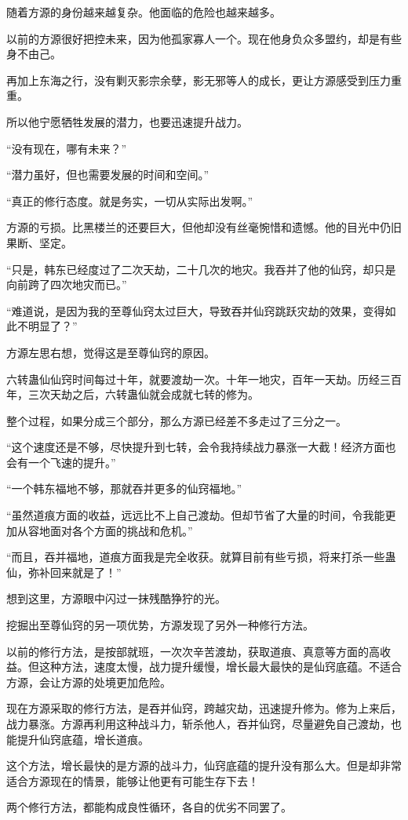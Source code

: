 \begin{this_body}
随着方源的身份越来越复杂。他面临的危险也越来越多。

以前的方源很好把控未来，因为他孤家寡人一个。现在他身负众多盟约，却是有些身不由己。

再加上东海之行，没有剿灭影宗余孽，影无邪等人的成长，更让方源感受到压力重重。

所以他宁愿牺牲发展的潜力，也要迅速提升战力。

“没有现在，哪有未来？”

“潜力虽好，但也需要发展的时间和空间。”

“真正的修行态度。就是务实，一切从实际出发啊。”

方源的亏损。比黑楼兰的还要巨大，但他却没有丝毫惋惜和遗憾。他的目光中仍旧果断、坚定。

“只是，韩东已经度过了二次天劫，二十几次的地灾。我吞并了他的仙窍，却只是向前跨了四次地灾而已。”

“难道说，是因为我的至尊仙窍太过巨大，导致吞并仙窍跳跃灾劫的效果，变得如此不明显了？”

方源左思右想，觉得这是至尊仙窍的原因。

六转蛊仙仙窍时间每过十年，就要渡劫一次。十年一地灾，百年一天劫。历经三百年，三次天劫之后，六转蛊仙就会成就七转的修为。

整个过程，如果分成三个部分，那么方源已经差不多走过了三分之一。

“这个速度还是不够，尽快提升到七转，会令我持续战力暴涨一大截！经济方面也会有一个飞速的提升。”

“一个韩东福地不够，那就吞并更多的仙窍福地。”

“虽然道痕方面的收益，远远比不上自己渡劫。但却节省了大量的时间，令我能更加从容地面对各个方面的挑战和危机。”

“而且，吞并福地，道痕方面我是完全收获。就算目前有些亏损，将来打杀一些蛊仙，弥补回来就是了！”

想到这里，方源眼中闪过一抹残酷狰狞的光。

挖掘出至尊仙窍的另一项优势，方源发现了另外一种修行方法。

以前的修行方法，是按部就班，一次次辛苦渡劫，获取道痕、真意等方面的高收益。但这种方法，速度太慢，战力提升缓慢，增长最大最快的是仙窍底蕴。不适合方源，会让方源的处境更加危险。

现在方源采取的修行方法，是吞并仙窍，跨越灾劫，迅速提升修为。修为上来后，战力暴涨。方源再利用这种战斗力，斩杀他人，吞并仙窍，尽量避免自己渡劫，也能提升仙窍底蕴，增长道痕。

这个方法，增长最快的是方源的战斗力，仙窍底蕴的提升没有那么大。但是却非常适合方源现在的情景，能够让他更有可能生存下去！

两个修行方法，都能构成良性循环，各自的优劣不同罢了。

\end{this_body}

